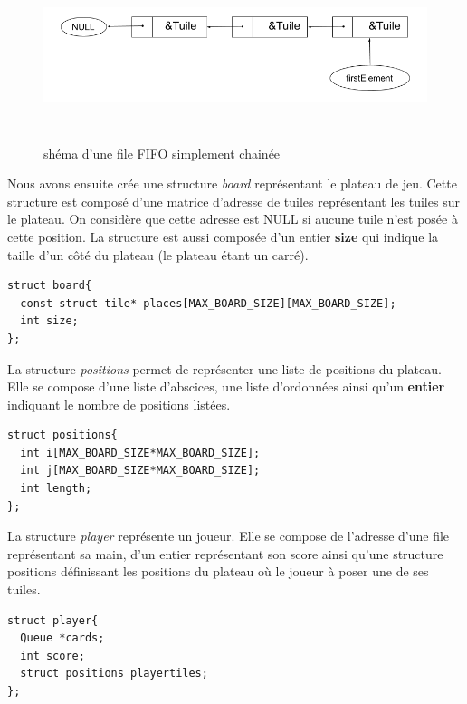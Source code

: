 \documentclass[12pt,a4paper]{extarticle}
\begin{document}
    \begin{figure}[h!]
        \centering
        \includegraphics[height = 5cm,width= 12cm]{img/schemafile}
        \caption{sh\'ema d'une file FIFO simplement chain\'ee}
    \end{figure}
    Nous avons ensuite cr\'ee une structure \emph{board} repr\'esentant le plateau de jeu. Cette structure est compos\'e d'une matrice d'adresse de tuiles repr\'esentant 
    les tuiles sur le plateau. On consid\`ere que cette adresse est NULL si aucune tuile n'est pos\'ee \`a cette position. La structure est aussi compos\'ee d'un 
    entier \textbf{size} qui indique la taille d'un c\^ot\'e du plateau (le plateau \'etant un carr\'e).  


    \begin{lstlisting}[style=CStyle]
struct board{
  const struct tile* places[MAX_BOARD_SIZE][MAX_BOARD_SIZE];
  int size;
}; \end{lstlisting}
    
    
    La structure \emph{positions} permet de repr\'esenter une liste de positions du plateau. Elle se compose d'une liste d'abscices, une liste d'ordonn\'ees ainsi qu'un 
    \textbf{entier} indiquant le nombre de positions list\'ees.
    

    \begin{lstlisting}[style=CStyle]
struct positions{
  int i[MAX_BOARD_SIZE*MAX_BOARD_SIZE];
  int j[MAX_BOARD_SIZE*MAX_BOARD_SIZE];
  int length;
}; \end{lstlisting}
    
    
    La structure \emph{player} repr\'esente un joueur. Elle se compose de l'adresse d'une file repr\'esentant sa main, d'un entier repr\'esentant son score ainsi qu'une 
    structure positions d\'efinissant les positions du plateau o\`u le joueur \`a poser une de ses tuiles.
    

    \begin{lstlisting}[style=CStyle]
struct player{
  Queue *cards;
  int score;
  struct positions playertiles;
}; \end{lstlisting}
    
\end{document}
